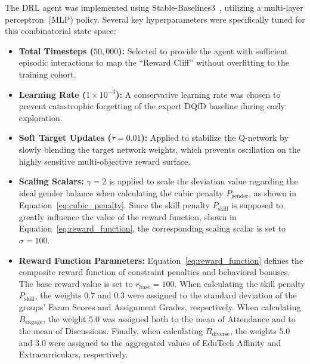 \documentclass{icai2026} %
\begin{document}
The DRL agent was implemented using Stable-Baselines3~\cite{SB3}, utilizing a multi-layer perceptron~(MLP) policy. Several key hyperparameters were specifically tuned for this combinatorial state space:
\begin{itemize}
    \item \textbf{Total Timesteps ($50,000$):} Selected to provide the agent with sufficient episodic interactions to map the ``Reward Cliff'' without overfitting to the training cohort.
    \item \textbf{Learning Rate ($1 \times 10^{-3}$):} A conservative learning rate was chosen to prevent catastrophic forgetting of the expert DQfD baseline during early exploration.
    \item \textbf{Soft Target Updates ($\tau = 0.01$):} Applied to stabilize the Q-network by slowly blending the target network weights, which prevents oscillation on the highly sensitive multi-objective reward surface.
    \item \textbf{Scaling Scalars:} $\gamma = 2$ is applied to scale the deviation value regarding the ideal gender balance when calculating the cubic penalty $P_{\text{gender}}$, as shown in Equation~\eqref{eq:cubic_penalty}.
    Since the skill penalty $P_{\text{skill}}$ is supposed to greatly influence the value of the reward function, shown in Equation~\eqref{eq:reward_function}, the corresponding scaling scalar is set to $\sigma = 100$.
    \item \textbf{Reward Function Parameters:} Equation~\eqref{eq:reward_function} defines the composite reward function  of constraint penalties and behavioral bonuses. The base reward value is set to $r_{\text{base}} = 100$. When calculating the skill penalty $P_{\text{skill}}$, the weights $0.7$ and $0.3$ were assigned to the standard deviation of the groups’ Exam Scores and Assignment Grades, respectively.
    When calculating $B_{\text{engage}}$, the weight $5.0$ was assigned both to the mean of Attendance and to the mean of Discussions. Finally, when calculating $B_{\text{diverse}}$, the weights $5.0$ and $3.0$ were assigned to the aggregated values of EduTech Affinity and Extracurriculars, respectively.
\end{itemize}
\end{document}
